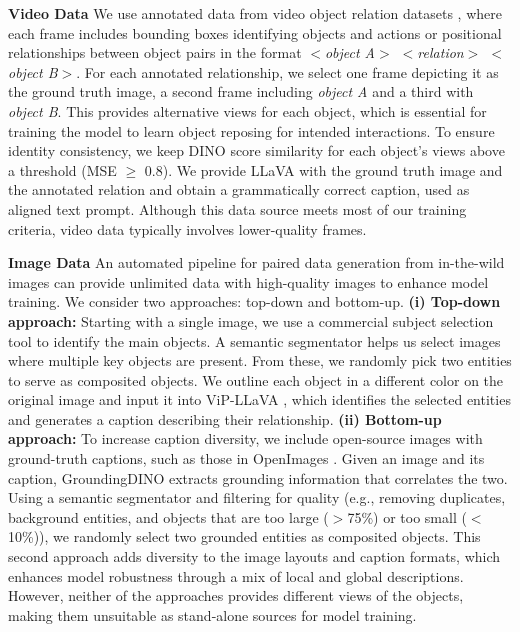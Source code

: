 \textbf{Video Data} We use annotated data from video object relation datasets \cite{shang2019annotating,shang2017video}, where each frame includes bounding boxes identifying objects and actions or positional relationships between object pairs in the format \textit{$<$object A$>$ $<$relation$>$ $<$object B$>$}. For each annotated relationship, we select one frame depicting it as the ground truth image, a second frame including \textit{object A} and a third with \textit{object B}. This provides alternative views for each object, which is essential for training the model to learn object reposing for intended interactions. To ensure identity consistency, we keep DINO score \cite{oquab2023dinov2} similarity for each object’s views above a threshold (MSE $\geq$ 0.8). We provide LLaVA \cite{liu2023improvedllava} with the ground truth image and the annotated relation and obtain a grammatically correct caption, used as aligned text prompt. Although this data source meets most of our training criteria, video data typically involves lower-quality frames.


\textbf{Image Data} An automated pipeline for paired data generation from in-the-wild images can provide unlimited data with high-quality images to enhance model training. We consider two approaches: top-down and bottom-up. \textbf{(i) Top-down approach:} Starting with a single image, we use a commercial subject selection tool to identify the main objects. A semantic segmentator \cite{qi2022entityseg} helps us select images where multiple key objects are present. From these, we randomly pick two entities to serve as composited objects. We outline each object in a different color on the original image and input it into ViP-LLaVA \cite{cai2024vip}, which identifies the selected entities and generates a caption describing their relationship. \textbf{(ii) Bottom-up approach:} To increase caption diversity, we include open-source images with ground-truth captions, such as those in OpenImages \cite{krylov2021open}. Given an image and its caption, GroundingDINO \cite{liu2023groundingdino} extracts grounding information that correlates the two. Using a semantic segmentator \cite{qi2022entityseg} and filtering for quality (e.g., removing duplicates, background entities, and objects that are too large ($>$75\%) or too small ($<$10\%)), we randomly select two grounded entities as composited objects. This second approach adds diversity to the image layouts and caption formats, which enhances model robustness through a mix of local and global descriptions. However, neither of the approaches provides different views of the objects, making them unsuitable as stand-alone sources for model training.


